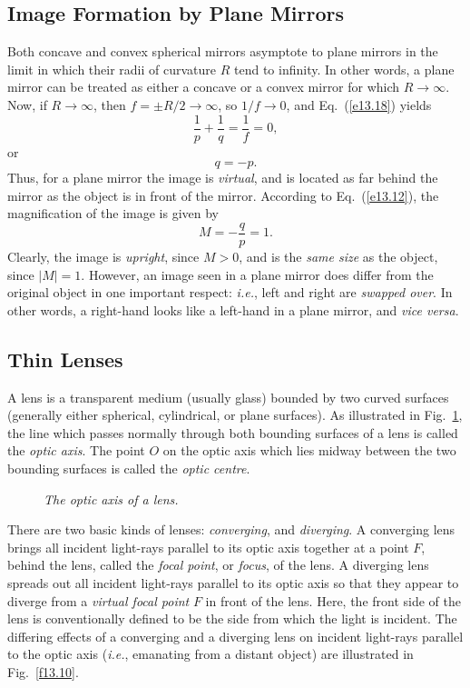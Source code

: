 \subsection{Image Formation by Plane Mirrors}
Both concave and convex spherical mirrors asymptote to plane mirrors
in the limit in which their radii of curvature $R$ tend to infinity.
In other words, a plane mirror can be treated as either 
 a concave or a convex mirror
for which $R\rightarrow \infty$. Now, if $R\rightarrow\infty$, then
$f=\pm R/2\rightarrow\infty$, so $1/f\rightarrow 0$, and Eq.~(\ref{e13.18})
yields
\begin{equation}
\frac{1}{p} + \frac{1}{q} = \frac{1}{f} = 0,
\end{equation}
or 
\begin{equation}
q = -p.
\end{equation}
Thus, for a plane mirror the image is {\em virtual}, and is
located as far behind the mirror as the object is in front of
the mirror. According to Eq.~(\ref{e13.12}), the magnification of the
image is given by
\begin{equation}
M = -\frac{q}{p} = 1.
\end{equation}
Clearly, the image is {\em upright}, since $M>0$, and is
the {\em same size}
as the object, since $|M|=1$. However, an  image seen
in a plane mirror does differ from the original object in one 
important respect: {\em i.e.}, 
left and right are {\em swapped over}. In other words, 
a right-hand looks like a left-hand in a plane mirror, and {\em vice
versa}. 

\subsection{Thin Lenses}
A lens is a transparent medium (usually glass) bounded by two
curved surfaces (generally either spherical, cylindrical, or
plane surfaces). As illustrated in Fig.~\ref{f13.9}, the
line which passes normally  through
both bounding surfaces of a lens   is called the {\em optic axis}.
The point $O$ on the optic axis which lies midway between the two bounding
surfaces  is called the {\em optic centre}.

\begin{figure}
\epsfysize=1.5in
\centerline{}
\caption{\em The optic axis of a lens.}\label{f13.9}
\end{figure}

 There are two basic
kinds of lenses: {\em converging}, and {\em diverging}. A converging lens 
brings all incident light-rays parallel to its optic axis together at
a point $F$, behind the lens,
called the {\em focal point}, or {\em focus}, of the lens.
A diverging lens spreads out all incident light-rays parallel
 to its optic axis so that they appear to diverge from a {\em  virtual
focal point} $F$ in front of the lens. Here, the front side of the lens
is conventionally defined to be the side from which the light is
incident. The differing effects of a converging and a diverging lens
on incident light-rays parallel to the optic axis ({\em i.e.}, 
emanating from a
distant object) are illustrated in Fig.~\ref{f13.10}. 

